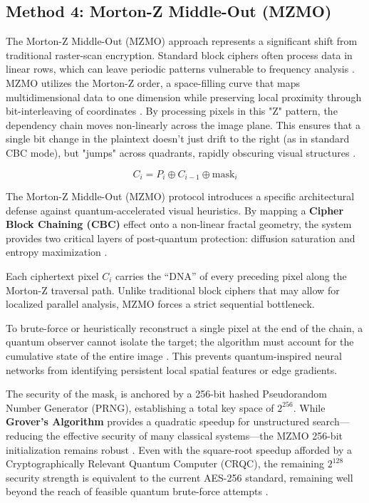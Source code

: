 \documentclass[12pt,fleqn]{article}
\begin{document}
\subsection{Method 4: Morton-Z Middle-Out (MZMO)}
The Morton-Z Middle-Out (MZMO) approach represents a significant shift from traditional raster-scan encryption. Standard block ciphers often process data in linear rows, which can leave periodic patterns vulnerable to frequency analysis \cite{schneier2007applied}. MZMO utilizes the Morton-Z order, a space-filling curve that maps multidimensional data to one dimension while preserving local proximity through bit-interleaving of coordinates \cite{morton1966computer}.
By processing pixels in this "Z" pattern, the dependency chain moves non-linearly across the image plane. This ensures that a single bit change in the plaintext doesn't just drift to the right (as in standard CBC mode), but "jumps" across quadrants, rapidly obscuring visual structures \cite{bader2012space}.

\begin{equation}
C_i = P_i \oplus C_{i-1} \oplus \text{mask}_i
\end{equation}

The Morton-Z Middle-Out (MZMO) protocol introduces a specific architectural defense against quantum-accelerated visual heuristics. By mapping a \textbf{Cipher Block Chaining (CBC)} effect onto a non-linear fractal geometry, the system provides two critical layers of post-quantum protection: diffusion saturation and entropy maximization \cite{katz2020introduction}.

Each ciphertext pixel $C_i$ carries the ``DNA'' of every preceding pixel along the Morton-Z traversal path. Unlike traditional block ciphers that may allow for localized parallel analysis, MZMO forces a strict sequential bottleneck. 

To brute-force or heuristically reconstruct a single pixel at the end of the chain, a quantum observer cannot isolate the target; the algorithm must account for the cumulative state of the entire image \cite{stinson2018cryptography}. This prevents quantum-inspired neural networks from identifying persistent local spatial features or edge gradients.

The security of the $\text{mask}_i$ is anchored by a 256-bit hashed Pseudorandom Number Generator (PRNG), establishing a total key space of $2^{256}$. While \textbf{Grover's Algorithm} provides a quadratic speedup for unstructured search—reducing the effective security of many classical systems—the MZMO 256-bit initialization remains robust \cite{grover1996fast}. Even with the square-root speedup afforded by a Cryptographically Relevant Quantum Computer (CRQC), the remaining $2^{128}$ security strength is equivalent to the current AES-256 standard, remaining well beyond the reach of feasible quantum brute-force attempts \cite{nist2016post}.
\end{document}
